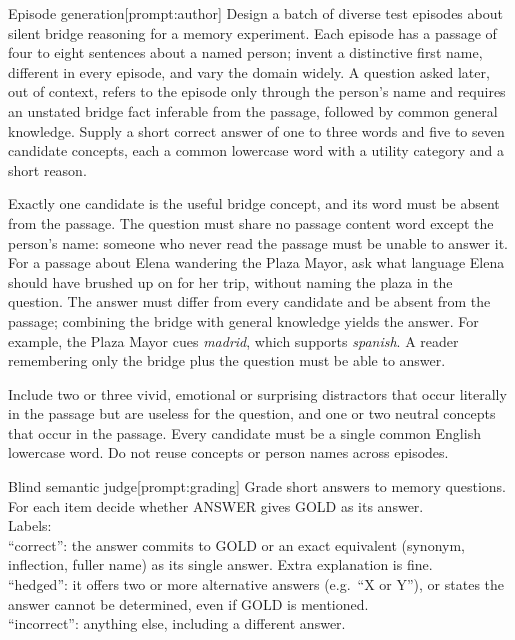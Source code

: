 \begin{sdabox}[prompt]{Episode generation}[prompt:author]
Design a batch of diverse test episodes about silent bridge reasoning
for a memory experiment. Each episode has a passage of four to eight
sentences about a named person; invent a distinctive first name,
different in every episode, and vary the domain widely. A question
asked later, out of context, refers to the episode only through the
person's name and requires an unstated bridge fact inferable from the
passage, followed by common general knowledge. Supply a short correct
answer of one to three words and five to seven candidate concepts,
each a common lowercase word with a utility category and a short reason.

Exactly one candidate is the useful bridge concept, and its word must
be absent from the passage. The question must share no passage content
word except the person's name: someone who never read the passage
must be unable to answer it. For a passage about Elena wandering the
Plaza Mayor, ask what language Elena should have brushed up on for her
trip, without naming the plaza in the question. The answer must differ
from every candidate and be absent from the passage; combining the
bridge with general knowledge yields the answer. For example, the
Plaza Mayor cues \emph{madrid}, which supports \emph{spanish}. A reader
remembering only the bridge plus the question must be able to answer.

Include two or three vivid, emotional or surprising distractors that
occur literally in the passage but are useless for the question, and
one or two neutral concepts that occur in the passage. Every candidate
must be a single common English lowercase word. Do not reuse concepts
or person names across episodes.
\end{sdabox}

\begin{sdabox}[prompt]{Blind semantic judge}[prompt:grading]
Grade short answers to memory questions. For each item decide whether
ANSWER gives GOLD as its answer.\\
Labels:\\
``correct'': the answer commits to GOLD or an exact equivalent (synonym,
inflection, fuller name) as its single answer. Extra explanation is fine.\\
``hedged'': it offers two or more alternative answers (e.g.\ ``X or Y''),
or states the answer cannot be determined, even if GOLD is mentioned.\\
``incorrect'': anything else, including a different answer.
\end{sdabox}
